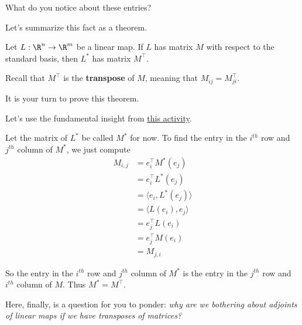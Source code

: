 \documentclass{ximera}
\begin{document}
\begin{question}
  What do you notice about these entries?
  \begin{solution}
    \begin{multiple-choice}
    \end{multiple-choice}
  \end{solution}
  
  Let's summarize this fact as a theorem.
  \begin{theorem}
    Let $L: \R^n \to \R^m$ be a linear map.
    If $L$ has matrix $M$ with respect to the standard basis, then $L^*$ has matrix $M^\top$.    
  \end{theorem}
  
  Recall that $M^\top$ is the \textbf{transpose} of $M$, meaning that $M_{ij} = M^\top_{ji}$.
  
  It is your turn to prove this theorem.
  
  \begin{free-response}
    Let's use the fundamental insight from \href{http://ximera.osu.edu/course/kisonecat/m2o2c2/course/activity/week1/inner-product/multiply-dot/}{this activity}.  
    
    Let the matrix of $L^*$ be called $M^*$ for now.
    To find the entry in the $i^{th}$ row and $j^{th}$ column of $M^*$, we just  compute 
    \begin{align*}
      M_{i,j} &= e_i^\top M^*(e_j)\\
      &=e_i^\top L^*(e_j)\\
      &= \langle e_i , L^*(e_j)\rangle\\
      &= \langle  L(e_i), e_j \rangle\\
      &=e_j^\top L(e_i)\\
      &=e_j^\top M(e_i)\\
      &= M_{j,i}
    \end{align*}
    
    So the entry  in the $i^{th}$ row and $j^{th}$ column of $M^*$ is the entry in the $j^{th}$ row and $i^{th}$ column of $M$.  Thus $M^* = M^\top$.
  \end{free-response}
  
  Here, finally, is a question for you to ponder: \textit{why are we bothering about adjoints of linear maps if we have transposes of matrices?}
  
\end{question}

	
\end{document}
